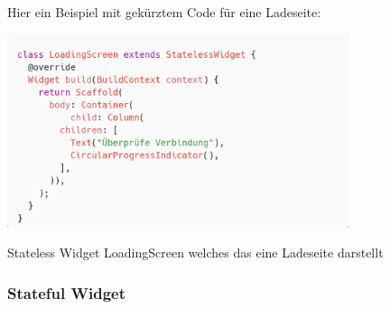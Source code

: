 Hier ein Beispiel mit gekürztem Code für eine Ladeseite:
\begin{code}[H]
    \centering
    \includegraphics[width=10cm]{images/Theorie/Programmiersprachen/statelessWidget.png}
    \vspace{-25pt}
    \caption{Stateless Widget LoadingScreen welches das eine Ladeseite darstellt}
\end{code}


\subsubsection{Stateful Widget}